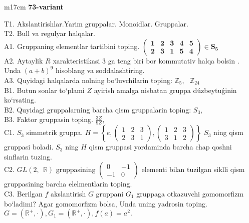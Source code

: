 \documentclass{article}
\begin{document}
\begin{tabular}{m{17cm}}
\textbf{73-variant}
\newline

T1. Akslantirishlar.Yarim gruppalar. Monoidlar. Gruppalar. \\
T2. Bull va regulyar halqalar. \\
A1. Gruppaning elementlar tartibini toping. \(\begin{pmatrix}
\mathbf{1} & \mathbf{2} & \mathbf{3} & \mathbf{4} & \mathbf{5} \\
\mathbf{2} & \mathbf{3} & \mathbf{1} & \mathbf{5} & \mathbf{4}
\end{pmatrix}\mathbf{\in}\mathbf{S}_{\mathbf{5}}\) \\
A2. Aytaylik \(R\) xarakteristikasi 3 ga teng biri bor kommutativ halqa bo\textquotesingle lsin . Unda \((a + b)^{9}\) hisoblang va soddalashtiring. \\
A3. Quyidagi halqalarda nolning bo`luvchilarin toping: \(\mathbb{Z}_{5},\ \ \ \mathbb{Z}_{24}\) \\
B1. Butun sonlar to`plami \(Z\) ayirish amalga nisbatan gruppa dúzbeytuǵinin ko`rsating. \\
B2. Quyidagi gruppalarning barcha qism gruppalarin toping: \(S_{3},\) \\
B3. Faktor gruppasin toping. \(\frac{3Z}{9Z}\), \\
C1. \(S_{3}\) simmetrik gruppa. \(H = \left\{ e,\begin{pmatrix}
1 & 2 & 3 \\
2 & 3 & 1
\end{pmatrix},\begin{pmatrix}
1 & 2 & 3 \\
3 & 1 & 2
\end{pmatrix} \right\}\) \(S_{3}\) ning qism gruppasi boladi. \(S_{3}\) ning \(H\) qism gruppasi yordaminda barcha chap qo\textquotesingle shni sinflarin tuzing. \\
C2. \(GL(2,\mathbb{\ \ R})\) gruppasining \(\begin{pmatrix}
0 & - 1 \\
 - 1 & 0
\end{pmatrix}\) elementi bilan tuzilgan siklli qism gruppasining barcha elelmentlarin toping. \\
C3. Berilgan \(f\) akslantirish \(G\) gruppani \(G_{1}\) gruppaga o\textquotesingle tkazuvchi gomomorfizm bo`ladimi? Agar gomomorfizm bolsa, Unda uning yadrosin toping. \(G = \left( \mathbb{R}^{+}, \cdot \right),G_{1} = \left( \mathbb{R}^{+}, \cdot \right),f(a) = a^{2}.\) \\

\end{tabular}
\vspace{1cm}
\end{document}
